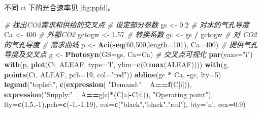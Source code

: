 \documentclass[
]{krantz}
\makeatletter
\newenvironment{Shaded}{\begin{snugshade}}{\end{snugshade}}
\newcommand{\CommentTok}[1]{\textcolor[rgb]{0.56,0.35,0.01}{\textit{#1}}}
\newcommand{\DataTypeTok}[1]{\textcolor[rgb]{0.13,0.29,0.53}{#1}}
\newcommand{\DecValTok}[1]{\textcolor[rgb]{0.00,0.00,0.81}{#1}}
\newcommand{\ErrorTok}[1]{\textcolor[rgb]{0.64,0.00,0.00}{\textbf{#1}}}
\newcommand{\FloatTok}[1]{\textcolor[rgb]{0.00,0.00,0.81}{#1}}
\newcommand{\KeywordTok}[1]{\textcolor[rgb]{0.13,0.29,0.53}{\textbf{#1}}}
\newcommand{\NormalTok}[1]{#1}
\newcommand{\OperatorTok}[1]{\textcolor[rgb]{0.81,0.36,0.00}{\textbf{#1}}}
\newcommand{\StringTok}[1]{\textcolor[rgb]{0.31,0.60,0.02}{#1}}
\newenvironment{kframe}{%
\medskip{}
\setlength{\fboxsep}{.8em}
 \def\at@end@of@kframe{}%
 \ifinner\ifhmode%
  \def\at@end@of@kframe{\end{minipage}}%
  \begin{minipage}{\columnwidth}%
 \fi\fi%
 \def\FrameCommand##1{\hskip\@totalleftmargin \hskip-\fboxsep
 \colorbox{shadecolor}{##1}\hskip-\fboxsep
     \hskip-\linewidth \hskip-\@totalleftmargin \hskip\columnwidth}%
 \MakeFramed {\advance\hsize-\width
   \@totalleftmargin\z@ \linewidth\hsize
   \@setminipage}}%
 {\par\unskip\endMakeFramed%
 \at@end@of@kframe}
\renewenvironment{Shaded}{\begin{kframe}}{\end{kframe}}
\makeatother
\begin{document}
不同 ci 下的光合速率见 \ref{fig:ppfd}。

\begin{Shaded}
\begin{Highlighting}[]
\CommentTok{# 找出CO2需求和供给的交叉点}
\CommentTok{# 设定部分参数}
\NormalTok{gs <-}\StringTok{ }\FloatTok{0.2} \CommentTok{# 对水的气孔导度}
\NormalTok{Ca <-}\StringTok{ }\DecValTok{400} \CommentTok{# 外部CO2}
\NormalTok{gctogw <-}\StringTok{ }\FloatTok{1.57} \CommentTok{# 转换系数}
\NormalTok{gc <-}\StringTok{ }\NormalTok{gs }\OperatorTok{/}\StringTok{ }\NormalTok{gctogw }\CommentTok{# 对 CO2 的气孔导度}
\CommentTok{# 需求曲线}
\NormalTok{p <-}\StringTok{ }\KeywordTok{Aci}\NormalTok{(}\KeywordTok{seq}\NormalTok{(}\DecValTok{60}\NormalTok{,}\DecValTok{500}\NormalTok{,}\DataTypeTok{length=}\DecValTok{101}\NormalTok{), }\DataTypeTok{Ca=}\DecValTok{400}\NormalTok{)}
\CommentTok{# 提供气孔导度及交叉点}
\NormalTok{g <-}\StringTok{ }\KeywordTok{Photosyn}\NormalTok{(}\DataTypeTok{GS=}\NormalTok{gs, }\DataTypeTok{Ca=}\NormalTok{Ca)}
\CommentTok{# 交叉点可视化}
\KeywordTok{par}\NormalTok{(}\DataTypeTok{yaxs=}\StringTok{"i"}\NormalTok{)}
\KeywordTok{with}\NormalTok{(p, }\KeywordTok{plot}\NormalTok{(Ci, ALEAF, }\DataTypeTok{type=}\StringTok{'l'}\NormalTok{, }
             \DataTypeTok{ylim=}\KeywordTok{c}\NormalTok{(}\DecValTok{0}\NormalTok{,}\KeywordTok{max}\NormalTok{(ALEAF))))}
\KeywordTok{with}\NormalTok{(g, }\KeywordTok{points}\NormalTok{(Ci, ALEAF, }\DataTypeTok{pch=}\DecValTok{19}\NormalTok{, }\DataTypeTok{col=}\StringTok{"red"}\NormalTok{))}
\KeywordTok{abline}\NormalTok{(gc }\OperatorTok{*}\StringTok{ }\NormalTok{Ca, }\OperatorTok{-}\NormalTok{gc, }\DataTypeTok{lty=}\DecValTok{5}\NormalTok{)}
\KeywordTok{legend}\NormalTok{(}\StringTok{"topleft"}\NormalTok{, }\KeywordTok{c}\NormalTok{(}\KeywordTok{expression}\NormalTok{(}
  \StringTok{"Demand:"}\OperatorTok{~}\ErrorTok{~}\NormalTok{A}\OperatorTok{==}\KeywordTok{f}\NormalTok{(C[i])),}
   \KeywordTok{expression}\NormalTok{(}\StringTok{"Supply:"}\OperatorTok{~}\ErrorTok{~}\NormalTok{A}\OperatorTok{==}\NormalTok{g[c]}\OperatorTok{*}\NormalTok{(C[a]}\OperatorTok{-}\NormalTok{C[i])),}
              \StringTok{"Operating point"}\NormalTok{),}
   \DataTypeTok{lty=}\KeywordTok{c}\NormalTok{(}\DecValTok{1}\NormalTok{,}\DecValTok{5}\NormalTok{,}\OperatorTok{-}\DecValTok{1}\NormalTok{),}\DataTypeTok{pch=}\KeywordTok{c}\NormalTok{(}\OperatorTok{-}\DecValTok{1}\NormalTok{,}\OperatorTok{-}\DecValTok{1}\NormalTok{,}\DecValTok{19}\NormalTok{),}
   \DataTypeTok{col=}\KeywordTok{c}\NormalTok{(}\StringTok{"black"}\NormalTok{,}\StringTok{"black"}\NormalTok{,}\StringTok{"red"}\NormalTok{),}
   \DataTypeTok{bty=}\StringTok{'n'}\NormalTok{, }\DataTypeTok{cex=}\FloatTok{0.9}\NormalTok{)}
\end{Highlighting}
\end{Shaded}
\end{document}
